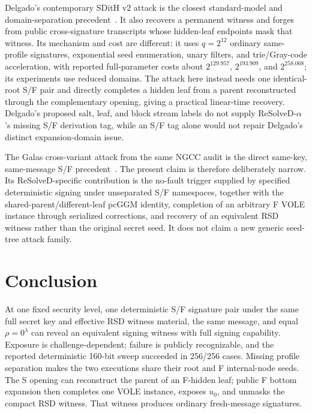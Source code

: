\documentclass[11pt,a4paper]{article}
\begin{document}
Delgado's contemporary SDitH v2 attack is the closest standard-model and
domain-separation precedent~\cite{delgado2026}.  It also recovers a permanent
witness and forges from public cross-signature transcripts whose hidden-leaf
endpoints mask that witness.  Its mechanism and cost are different: it uses
$q=2^{12}$ ordinary same-profile signatures, exponential seed enumeration,
unary filters, and trie/Gray-code acceleration, with reported full-parameter
costs about $2^{129.957}$, $2^{193.909}$, and $2^{258.068}$; its experiments use
reduced domains.  The attack here instead needs one identical-root S/F pair and
directly completes a hidden leaf from a parent reconstructed through the
complementary opening, giving a practical linear-time recovery.  Delgado's
proposed salt, leaf, and block stream labels
do not supply ReSolveD-$\alpha$'s missing S/F derivation tag, while an S/F tag
alone would not repair Delgado's distinct expansion-domain issue.

The Galas cross-variant attack from the same NGCC audit is the direct same-key,
same-message S/F precedent~\cite{galas-attack}.  The present claim is therefore
deliberately narrow.  Its ReSolveD-specific contribution is the no-fault
trigger supplied by specified deterministic signing under unseparated S/F
namespaces, together with the shared-parent/different-leaf pcGGM identity,
completion of an arbitrary F VOLE instance through serialized corrections, and
recovery of an equivalent RSD witness rather than the original secret seed.  It
does not claim a new generic seed-tree attack family.

\section{Conclusion}

At one fixed security level, one deterministic S/F signature pair under the
same full secret key and effective RSD witness material, the same message, and
equal $\rho=0^\lambda$ can reveal an equivalent signing witness with full
signing capability.  Exposure is challenge-dependent; failure is publicly
recognizable, and the reported deterministic 160-bit sweep succeeded in
256/256 cases.  Missing profile separation makes the two executions share their
root and F internal-node seeds.  The S opening can reconstruct the parent of an
F-hidden leaf; public F bottom expansion then completes one VOLE instance,
exposes $u_0$, and unmasks the compact RSD witness.  That witness produces
ordinary fresh-message signatures.
\end{document}
